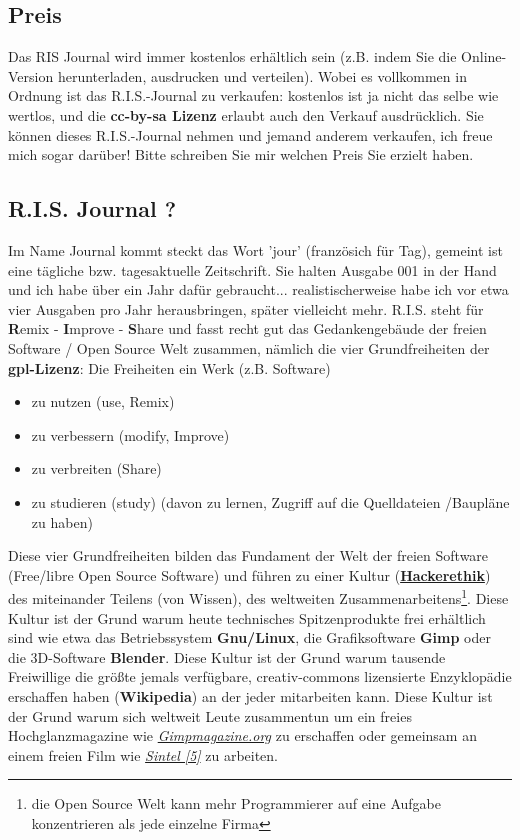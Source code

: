 \documentclass[10pt,a4paper,ngerman,twoside]{article} %
\begin{document}
\subsection*{Preis}
Das RIS Journal wird immer kostenlos erhältlich sein (z.B. indem Sie die Online-Version herunterladen, ausdrucken und verteilen). Wobei es vollkommen in Ordnung ist das R.I.S.-Journal zu verkaufen: kostenlos ist ja nicht das selbe wie wertlos, und die \textbf{cc-by-sa Lizenz} erlaubt auch den Verkauf ausdrücklich. Sie können dieses R.I.S.-Journal nehmen und jemand anderem verkaufen, ich freue mich sogar darüber! Bitte schreiben Sie mir welchen Preis Sie erzielt haben. 

\subsection*{R.I.S. Journal ?}
Im Name Journal kommt steckt das Wort 'jour' (französich für Tag), gemeint ist eine tägliche bzw. tagesaktuelle Zeitschrift. Sie halten Ausgabe 001 in der Hand und ich habe über ein Jahr dafür gebraucht... realistischerweise habe ich vor etwa vier Ausgaben pro Jahr herausbringen, später vielleicht mehr. R.I.S. steht für \textbf{R}emix - \textbf{I}mprove - \textbf{S}hare und fasst recht gut das Gedankengebäude der freien Software / Open Source Welt zusammen, nämlich die vier Grundfreiheiten der \textbf{gpl-Lizenz}: Die Freiheiten ein Werk (z.B. Software) 
\begin{itemize}
\item zu nutzen (use, Remix)
\item zu verbessern (modify, Improve)
\item zu verbreiten (Share)
\item zu studieren (study) (davon zu lernen, Zugriff auf die Quelldateien /Baupläne zu haben)
\end{itemize}

Diese vier Grundfreiheiten bilden das Fundament der Welt der freien Software (Free/libre Open Source Software) und führen zu einer Kultur (\href{http://en.wikipedia.org/wiki/Hacker_ethic}{\textbf{Hackerethik}}) des miteinander Teilens (von Wissen), des weltweiten Zusammenarbeitens\footnote{die Open Source Welt kann mehr Programmierer auf eine Aufgabe konzentrieren als jede einzelne Firma}. Diese Kultur ist der Grund warum heute technisches Spitzenprodukte frei erhältlich sind wie etwa das Betriebssystem \textbf{Gnu/Linux}, die Grafiksoftware \textbf{Gimp} oder die 3D-Software \textbf{Blender}. Diese Kultur ist der Grund warum tausende Freiwillige die größte jemals verfügbare, creativ-commons lizensierte Enzyklopädie erschaffen haben (\textbf{Wikipedia}) an der jeder mitarbeiten kann. Diese Kultur ist der Grund warum sich weltweit Leute zusammentun um ein freies Hochglanzmagazine wie \href{http://gimpmagazine.org/}{\textit{Gimpmagazine.org}} zu erschaffen oder gemeinsam an einem freien Film wie \href{http://www.sintel.org/}{\textit{Sintel [5]}} zu arbeiten. \\
\end{document}
